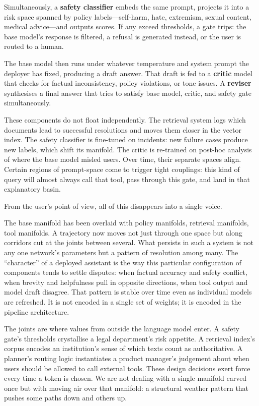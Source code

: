 \documentclass[12pt,a4paper]{article}
\begin{document}
Simultaneously, a \textbf{safety classifier} embeds the same prompt, projects it into a risk space spanned by policy labels---self-harm, hate, extremism, sexual content, medical advice---and outputs scores. If any exceed thresholds, a gate trips: the base model's response is filtered, a refusal is generated instead, or the user is routed to a human.

The base model then runs under whatever temperature and system prompt the deployer has fixed, producing a draft answer. That draft is fed to a \textbf{critic} model that checks for factual inconsistency, policy violations, or tone issues. A \textbf{reviser} synthesises a final answer that tries to satisfy base model, critic, and safety gate simultaneously.

These components do not float independently. The retrieval system logs which documents lead to successful resolutions and moves them closer in the vector index. The safety classifier is fine-tuned on incidents: new failure cases produce new labels, which shift its manifold. The critic is re-trained on post-hoc analysis of where the base model misled users. Over time, their separate spaces align. Certain regions of prompt-space come to trigger tight couplings: this kind of query will almost always call that tool, pass through this gate, and land in that explanatory basin.

From the user's point of view, all of this disappears into a single voice.

The base manifold has been overlaid with policy manifolds, retrieval manifolds, tool manifolds. A trajectory now moves not just through one space but along corridors cut at the joints between several. What persists in such a system is not any one network's parameters but a pattern of resolution among many. The ``character'' of a deployed assistant is the way this particular configuration of components tends to settle disputes: when factual accuracy and safety conflict, when brevity and helpfulness pull in opposite directions, when tool output and model draft disagree. That pattern is stable over time even as individual models are refreshed. It is not encoded in a single set of weights; it is encoded in the pipeline architecture.

The joints are where values from outside the language model enter. A safety gate's thresholds crystallise a legal department's risk appetite. A retrieval index's corpus encodes an institution's sense of which texts count as authoritative. A planner's routing logic instantiates a product manager's judgement about when users should be allowed to call external tools. These design decisions exert force every time a token is chosen. We are not dealing with a single manifold carved once but with moving air over that manifold: a structural weather pattern that pushes some paths down and others up.
\end{document}
